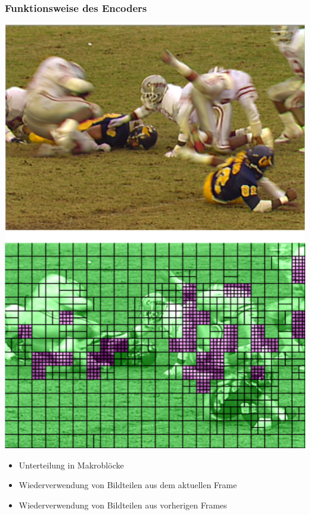 \documentclass[t]{beamer}
\begin{document}
\begin{frame}
	\frametitle{Funktionsweise des Encoders}
	\begin{minipage}{5.5cm}
		\includegraphics[scale=.29]{overlay-medium.png}	
	\end{minipage}
	\begin{minipage}{5.5cm}
		\begin{itemize}
			\item<+-> Unterteilung in Makroblöcke
			\item<+-> Wiederverwendung von Bildteilen aus dem aktuellen Frame
			\item<+-> Wiederverwendung von Bildteilen aus vorherigen Frames
		\end{itemize}
	\end{minipage}
\end{frame}
\end{document}
